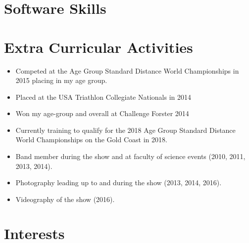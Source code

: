 \section{Software Skills}


\section{Extra Curricular Activities}

{%
  \begin{itemize}
    \item Competed at the Age Group Standard Distance World Championships in 2015 placing  in my age group.
    \item Placed  at the USA Triathlon Collegiate Nationals in 2014
    \item Won my age-group and  overall at Challenge Forster 2014
    \item Currently training to qualify for the 2018 Age Group Standard Distance World Championships on the Gold Coast in 2018.
  \end{itemize}
}

{%
\begin{itemize}
  \item Band member during the show and at faculty of science events (2010, 2011, 2013, 2014).
  \item Photography leading up to and during the show (2013, 2014, 2016).
  \item Videography of the show (2016).
\end{itemize}
}


\section{Interests}

\vspace{2em}


